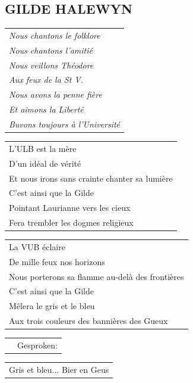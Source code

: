 \documentclass[a4paper, 14pt]{extarticle}
\begin{document}
\subsection*{GILDE HALEWYN}
\begin{flushleft}
\begin{tabularx}{\textwidth} {
    >{\raggedright\arraybackslash}X}
\textit{Nous chantons le folklore}\\
\textit{Nous chantons l’amitié}\\
\textit{Nous veillons Théodore}\\
\textit{Aux feux de la St V.}\\
\textit{Nous avons la penne fière}\\
\textit{Et aimons la Liberté}\\
\textit{Buvons toujours à l’Université}\\
\end{tabularx}
\end{flushleft}
\begin{flushleft}
\begin{tabularx}{\textwidth} {
    >{\raggedright\arraybackslash}X}
L’ULB est la mère\\
D’un idéal de vérité\\
Et nous irons sans crainte chanter sa lumière\\
C’est ainsi que la Gilde\\
Pointant Laurianne vers les cieux\\
Fera trembler les dogmes religieux\\
\end{tabularx}
\end{flushleft}
\begin{flushleft}
\begin{tabularx}{\textwidth} {
    >{\raggedright\arraybackslash}X}
La VUB éclaire\\
De mille feux nos horizons\\
Nous porterons sa flamme au-delà des frontières\\
C’est ainsi que la Gilde\\
Mêlera le gris et le bleu\\
Aux trois couleurs des bannières des Gueux\\
\end{tabularx}
\end{flushleft}
\begin{flushleft}
\begin{tabularx}{\textwidth} {
    c >{\raggedright\arraybackslash}X}
\hspace{5mm} & {\small Gesproken:}\\
\end{tabularx}
\end{flushleft}
\begin{flushleft}
\begin{tabularx}{\textwidth} {
    >{\raggedright\arraybackslash}X}
Gris et bleu... Bier en Geus\\
\end{tabularx}
\end{flushleft}
\end{document}
